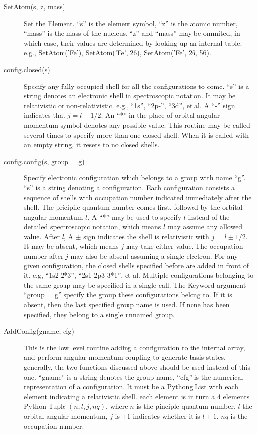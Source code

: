 \documentclass[12pt]{article}
\begin{document}
\begin{description}
\item[SetAtom(s, z, mass)] 
Set the Element. ``s'' is the element symbol, ``z'' is
the atomic number, ``mass'' is the mass of the nucleus. ``z'' and ``mass'' may
be ommited, in which case, their values are determined by looking up an
internal table. e.g., SetAtom('Fe'), SetAtom('Fe', 26), SetAtom('Fe', 26, 56).

\item[config.closed(s)] 
Specify any fully occupied shell for all the
configurations to come. ``s'' is a string denotes an electronic shell in
spectroscopic notation. It may be relativistic or non-relativistic. e.g., 
``1s'', ``2p-'', ``3d'', et al. A ``-'' sign indicates that $j = l - 1/2$. 
An ``*'' in the place of orbital angular momentum symbol denotes any possible
value. This routine may be called several times to specify more than one closed
shell. When it is called with an empty string, it resets to no closed shells. 

\item[config.config(s, group = g)] 
Specify electronic configuration which
belongs to a group with name ``g''. ``s'' is a string denoting a
configuration. Each configuration consists a sequence of shells with
occupation number indicated immediately after the shell. The pricipile quantum
number comes first, followed by the orbital angular momentum $l$. A ``*'' may
be used to specify $l$ instead of the detailed spectroscopic notation, which
means $l$ may assume any allowed value. After $l$,  A $\pm$ sign
indicates the shell is relativistic with $j$ = $l\pm 1/2$. It may be absent,
which means $j$ may take either value. The occupation number after $j$ may
also be absent assuming a single electron. For any given configuration, the
closed shells specified before are added in front of it. e.g, ``1s2 2*3'', 
``2s1 2p3 3*1'', et al. Multiple configurations belonging to the same group
may be specified in a single call. The Keyword argument ``group = g'' specify
the group these configurations belong to. If it is absent, 
then the last specified group name is used. If none has been specified, they
belong to a single unnamed group. 

\item[AddConfig(gname, cfg)] 
This is the low level routine adding a
configuration to the internal array, and perform angular momentum coupling to
generate basis states. generally, the two functions discussed above should be
used instead of this one. ``gname'' is a string denotes the group name, 
``cfg'' is the numerical representation of a configuration. It must be a
Pythong List with 
each element indicating a relativistic shell. each element is in turn a 4
elements Python Tuple $(n, l, j, nq)$, where $n$ is the pinciple quantum
number, $l$ the orbital angular momentum, $j$ is $\pm 1$ indicates whether it
is $l\pm 1$. $nq$ is the occupation number.

\end{description}
\end{document}
